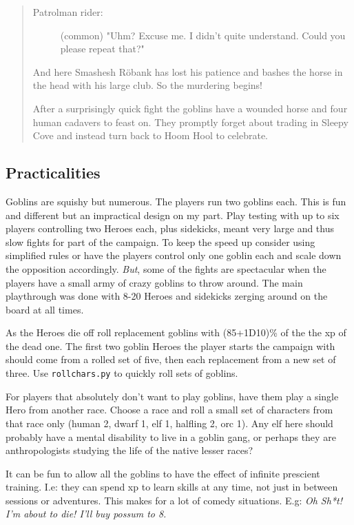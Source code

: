 \begin{quote}
\begin{small}
\begin{description}
\item[Patrolman rider:] \vvsmall (common) \small
"Uhm? Excuse me. I didn't quite understand. Could you please repeat that?"

\end{description}

And here Smashesh Röbank has lost his patience and bashes the horse in the head with his large club. So the murdering begins!

After a surprisingly quick fight the goblins have a wounded horse and four human cadavers to feast on. They promptly forget about trading in Sleepy Cove and instead turn back to Hoom Hool to celebrate.

\end{small}
\end{quote}


\subsection*{Practicalities}

Goblins are squishy but numerous. The players run two goblins each. This is fun and different but an impractical design on my part. Play testing with up to six players controlling two Heroes each, plus sidekicks, meant very large and thus slow fights for part of the campaign. To keep the speed up consider using simplified rules or have the players control only one goblin each and scale down the opposition accordingly. \emph{But}, some of the fights are spectacular when the players have a small army of crazy goblins to throw around. The main playthrough was done with 8-20 Heroes and sidekicks zerging around on the board at all times.

As the Heroes die off roll replacement goblins with (85+1D10)\% of the the xp of the dead one. The first two goblin Heroes the player starts the campaign with should come from a rolled set of five, then each replacement from a new set of three. Use \verb|rollchars.py| to quickly roll sets of goblins.

For players that absolutely don't want to play goblins, have them play a single Hero from another race. Choose a race and roll a small set of characters from that race only (human 2, dwarf 1, elf 1, halfling 2, orc 1). Any elf here should probably have a mental disability to live in a goblin gang, or perhaps they are anthropologists studying the life of the native lesser races?

It can be fun to allow all the goblins to have the effect of infinite prescient training. I.e: they can spend xp to learn skills at any time, not just in between sessions or adventures. This makes for a lot of comedy situations. E.g: \emph{Oh Sh*t! I'm about to die! I'll buy possum to 8.}


